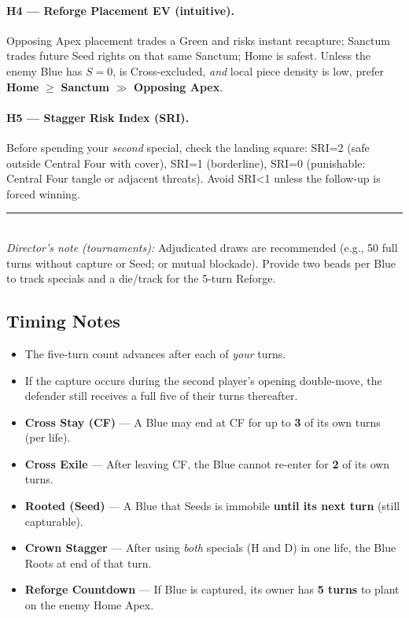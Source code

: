 \documentclass[11pt]{article}
\begin{document}
\paragraph{H4 — Reforge Placement EV (intuitive).}
Opposing Apex placement trades a Green and risks instant recapture; Sanctum trades future Seed rights on that same Sanctum; Home is safest. Unless the enemy Blue has $S=0$, is Cross-excluded, \emph{and} local piece density is low, prefer \textbf{Home} $\ge$ \textbf{Sanctum} $\gg$ \textbf{Opposing Apex}.

\paragraph{H5 — Stagger Risk Index (SRI).}
Before spending your \emph{second} special, check the landing square:
SRI=2 (safe outside Central Four with cover), SRI=1 (borderline), SRI=0 (punishable: Central Four tangle or adjacent threats).
Avoid SRI<1 unless the follow-up is forced winning.

\bigskip

\noindent\rule{\linewidth}{0.4pt}\\
\small\emph{Director’s note (tournaments):} Adjudicated draws are recommended (e.g., 50 full turns without capture or Seed; or mutual blockade). Provide two beads per Blue to track specials and a die/track for the 5-turn Reforge.

\subsection*{Timing Notes}
\begin{itemize}
  \item The five-turn count advances after each of \emph{your} turns.
  \item If the capture occurs during the second player’s opening double-move, the defender still receives a full five of their turns thereafter.
\end{itemize}

\begin{tcolorbox}[enhanced,title={Five Clocks (Summary)},colback=white,colframe=royal]
\label{tbl:five-clocks}
\small
\begin{itemize}\itemsep0.2em
  \item \textbf{Cross Stay (CF)} — A Blue may end at CF for up to \textbf{3} of its own turns (per life).
  \item \textbf{Cross Exile} — After leaving CF, the Blue cannot re-enter for \textbf{2} of its own turns.
  \item \textbf{Rooted (Seed)} — A Blue that Seeds is immobile \textbf{until its next turn} (still capturable).
  \item \textbf{Crown Stagger} — After using \emph{both} specials (H and D) in one life, the Blue Roots at end of that turn.
  \item \textbf{Reforge Countdown} — If Blue is captured, its owner has \textbf{5 turns} to plant on the enemy Home Apex.
\end{itemize}
\end{tcolorbox}
\end{document}

